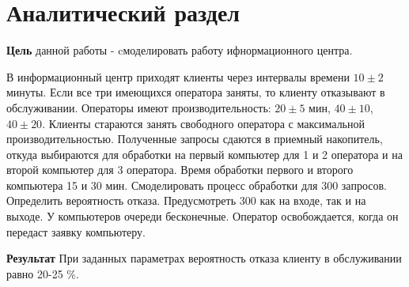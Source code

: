 \chapter{Аналитический раздел}

\textbf{Цель} данной работы - cмоделировать работу ифнормационного центра. 

В информационный центр приходят клиенты через интервалы времени $10\pm2$ минуты. Если все три имеющихся оператора заняты, то клиенту отказывают в обслуживании. Операторы имеют производительность: $20\pm5$ мин, $40\pm10$, $40\pm20$. Клиенты стараются занять свободного оператора с максимальной производительностью. Полученные запросы сдаются в приемный накопитель, откуда выбираются для обработки на первый компьютер для 1 и 2 оператора и на второй компьютер для 3 оператора. Время обработки первого и второго компьютера 15 и 30 мин.
Смоделировать процесс обработки для 300 запросов. Определить вероятность отказа.
Предусмотреть 300 как на входе, так и на выходе. У компьютеров очереди бесконечные. Оператор освобождается, когда он передаст заявку компьютеру.

\textbf{Результат} При заданных параметрах вероятность отказа клиенту в обслуживании равно 20-25 \%. 